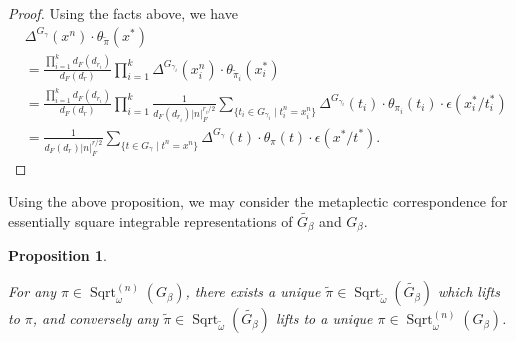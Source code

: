 \documentclass{amsart}
\numberwithin{equation}{section}
\newtheorem{proposition}[theorem]{\bf{Proposition}}
\newcommand{\abs}[1]{\left|#1\right|_{F}}
\newcommand{\mrsqrt}{\operatorname{Sqrt}}
\newcommand{\dF}[1]{d_{F}(#1)}
\newcommand{\wt}[1]{\widetilde{#1}}
\begin{document}
\begin{proof}
		Using the facts above, we have
		\begin{align*}
			&\Delta^{G_{\gamma}}(x^{n})\cdot\theta_{\wt{\pi}}(x^{*})\\%
			&=\frac{\prod_{i=1}^{k}\dF{d_{r_{i}}}}{\dF{d_{r}}}\prod_{i=1}^{k}\Delta^{G_{\gamma_{i}}}(x_{i}^{n})\cdot\theta_{\wt{\pi}_{i}}(x_{i}^{*})\\
			&=\frac{\prod_{i=1}^{k}\dF{d_{r_{i}}}}{\dF{d_{r}}}\prod_{i=1}^{k}\frac{1}{\dF{d_{r_{i}}}\abs{n}^{r_{i}/2}}\sum_{\{t_{i}\in G_{\gamma_{i}}\mid t_{i}^{n}=x_{i}^{n}\}}\Delta^{G_{\gamma_{i}}}(t_{i})\cdot\theta_{\pi_{i}}(t_{i})\cdot\epsilon(x_{i}^{*}/t_{i}^{*})\\
			&=\frac{1}{\dF{d_{r}}\abs{n}^{r/2}}\sum_{\{t\in G_{\gamma}\mid t^{n}=x^{n}\}}\Delta^{G_{\gamma}}(t)\cdot\theta_{\pi}(t)\cdot\epsilon(x^{*}/t^{*}).
		\end{align*}
		
		
	\end{proof}
	
	Using the above proposition, we may consider the metaplectic correspondence for essentially square integrable representations of $\wt{G_{\beta}}$ and $G_{\beta}$.
	
	\begin{proposition}\label{propmclift}
		
		For any $\pi\in\mrsqrt^{(n)}_{\omega}(G_{\beta})$, there exists a unique $\wt{\pi}\in\mrsqrt_{\wt{\omega}}(\wt{G_{\beta}})$ which lifts to $\pi$, and conversely any $\wt{\pi}\in\mrsqrt_{\wt{\omega}}(\wt{G_{\beta}})$ lifts to a unique $\pi\in\mrsqrt^{(n)}_{\omega}(G_{\beta})$.
		
	\end{proposition}
	
\end{document}
